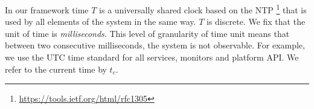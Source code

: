 



In our framework
time $T$ is a universally shared clock based on the NTP
\footnote{\url{https://tools.ietf.org/html/rfc1305}} that is used by all elements of the system in the same way. 
$T$ is discrete.
We fix that the unit of time is \emph{milliseconds}.
This level of granularity of time unit means that between
two consecutive milliseconds, the system is not observable.
For example, we use the UTC time standard for all services, monitors and platform API.
We refer to the current time by $t_c$.

